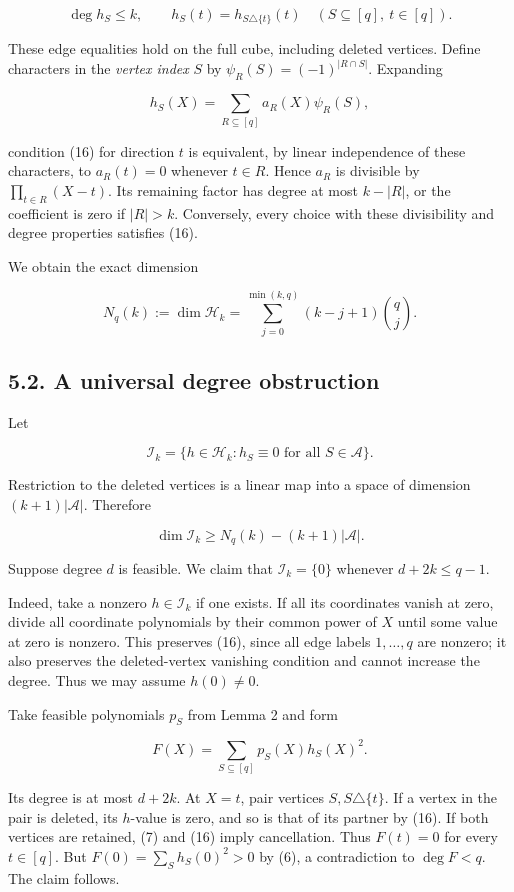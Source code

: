 \documentclass[
  10pt,
]{article}
\begin{document}
\[
 \deg h_S\le k,\qquad
 h_S(t)=h_{S\triangle\{t\}}(t)\quad(S\subseteq[q],\ t\in[q]).\tag{16}
\]

These edge equalities hold on the full cube, including deleted vertices. Define characters in the \emph{vertex index} \(S\) by \(\psi_R(S)=(-1)^{|R\cap S|}\). Expanding

\[
 h_S(X)=\sum_{R\subseteq[q]}a_R(X)\psi_R(S),
\]

condition (16) for direction \(t\) is equivalent, by linear independence of these characters, to \(a_R(t)=0\) whenever \(t\in R\). Hence \(a_R\) is divisible by \(\prod_{t\in R}(X-t)\). Its remaining factor has degree at most \(k-|R|\), or the coefficient is zero if \(|R|>k\). Conversely, every choice with these divisibility and degree properties satisfies (16).

We obtain the exact dimension

\[
 N_q(k):=\dim\mathcal H_k
 =\sum_{j=0}^{\min(k,q)}(k-j+1)\binom qj.\tag{17}
\]

\subsection{5.2. A universal degree obstruction}\label{a-universal-degree-obstruction}

Let

\[
 \mathcal I_k=\{h\in\mathcal H_k:h_S\equiv0\text{ for all }S\in\mathcal A\}.
\]

Restriction to the deleted vertices is a linear map into a space of dimension \((k+1)|\mathcal A|\). Therefore

\[
 \dim\mathcal I_k\ge N_q(k)-(k+1)|\mathcal A|.\tag{18}
\]

Suppose degree \(d\) is feasible. We claim that \(\mathcal I_k=\{0\}\) whenever \(d+2k\le q-1\).

Indeed, take a nonzero \(h\in\mathcal I_k\) if one exists. If all its coordinates vanish at zero, divide all coordinate polynomials by their common power of \(X\) until some value at zero is nonzero. This preserves (16), since all edge labels \(1,\ldots,q\) are nonzero; it also preserves the deleted-vertex vanishing condition and cannot increase the degree. Thus we may assume \(h(0)\ne0\).

Take feasible polynomials \(p_S\) from Lemma 2 and form

\[
 F(X)=\sum_{S\subseteq[q]}p_S(X)h_S(X)^2.
\]

Its degree is at most \(d+2k\). At \(X=t\), pair vertices \(S,S\triangle\{t\}\). If a vertex in the pair is deleted, its \(h\)-value is zero, and so is that of its partner by (16). If both vertices are retained, (7) and (16) imply cancellation. Thus \(F(t)=0\) for every \(t\in[q]\). But \(F(0)=\sum_Sh_S(0)^2>0\) by (6), a contradiction to \(\deg F<q\). The claim follows.
\end{document}
